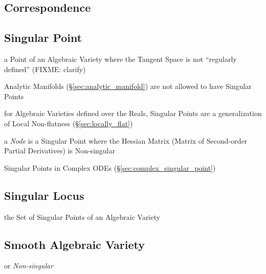 \subsection{Correspondence}\label{sec:variety_correspondence}

\subsection{Singular Point}\label{sec:singular_point}

a Point of an Algebraic Variety where the Tangent Space is not ``regularly
defined'' (FIXME: clarify)

Analytic Manifolds (\S\ref{sec:analytic_manifold}) are not allowed to have
Singular Points

for Algebraic Varieties defined over the Reals, Singular Points are a
generalization of Local Non-flatness (\S\ref{sec:locally_flat})

a \emph{Node} is a Singular Point where the Hessian Matrix (Matrix of
Second-order Partial Derivatives) is Non-singular

\fist Singular Points in Complex ODEs (\S\ref{sec:complex_singular_point})



\subsection{Singular Locus}\label{sec:singular_locus}

the Set of Singular Points of an Algebraic Variety



\subsection{Smooth Algebraic Variety}\label{sec:smooth_variety}

or \emph{Non-singular}

